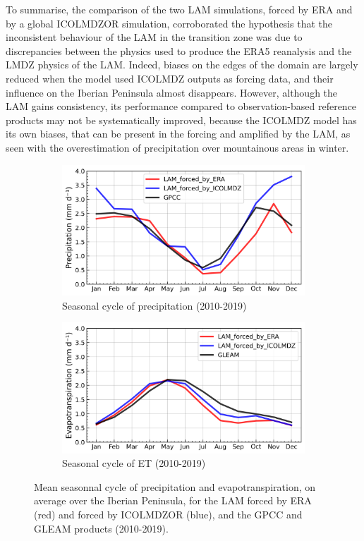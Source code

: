 \hfill

To summarise, the comparison of the two LAM simulations, forced by ERA and by a global ICOLMDZOR simulation, corroborated the hypothesis that the inconsistent behaviour of the LAM in the transition zone was due to discrepancies between the physics used to produce the ERA5 reanalysis and the LMDZ physics of the LAM. Indeed, biases on the edges of the domain are largely reduced when the model used ICOLMDZ outputs as forcing data, and their influence on the Iberian Peninsula almost disappears. However, although the LAM gains consistency, its performance compared to observation-based reference products may not be systematically improved, because the ICOLMDZ model has its own biases, that can be present in the forcing and amplified by the LAM, as seen with the overestimation of precipitation over mountainous areas in winter.

\begin{figure}[htbp]
    \centering
    \begin{subfigure}[b]{0.49\textwidth}
        \caption{Seasonal cycle of precipitation (2010-2019)}
        \includegraphics[width=\textwidth]{images/chap4/forcing_source/IP_seasonal_cycle_precip.png}
    \end{subfigure}
    \begin{subfigure}[b]{0.49\textwidth}
        \caption{Seasonal cycle of ET (2010-2019)}
        \includegraphics[width=\textwidth]{images/chap4/forcing_source/IP_seasonal_cycle_evap.png}
    \end{subfigure}
    \caption{Mean seasonnal cycle of precipitation and evapotranspiration, on average over the Iberian Peninsula, for the LAM forced by ERA (red) and forced by ICOLMDZOR (blue), and the GPCC and GLEAM products (2010-2019).}
    \label{fig:forcing_source_SC}
\end{figure}

